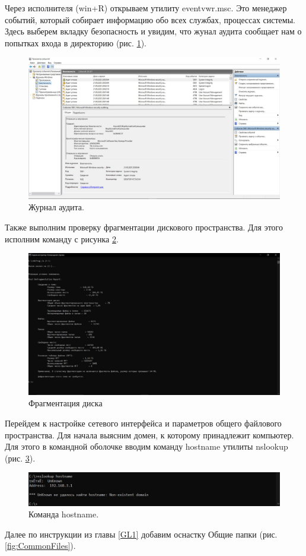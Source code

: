 Через исполнителя (win+R) открываем утилиту eventvwr.msc. Это менеджер событий, который собирает информацию обо всех службах, процессах системы. Здесь выберем вкладку безопасность и увидим, что жунал аудита сообщает нам о попытках входа в директорию (рис. \ref{fig:EventManager}).

\begin{figure}[h!]
    \centering
    \includegraphics[width=0.5\linewidth]{Pic/lab2/photo_2025-05-21_21-19-33.jpg}
    \caption{Журнал аудита.}
    \label{fig:EventManager}
\end{figure}

Также выполним проверку фрагментации дискового пространства. Для этого исполним команду с рисунка \ref{fig:discfrag}.

\begin{figure}[h!]
    \centering
    \includegraphics[width=0.9\linewidth]{Pic/lab2/photo_2025-05-21_21-19-34.jpg}
    \caption{Фрагментация диска}
    \label{fig:discfrag}
\end{figure}

Перейдем к настройке сетевого интерфейса и параметров общего файлового пространства. Для начала выясним домен, к которому принадлежит компьютер. Для этого в командной оболочке вводим команду hostname утилиты nslookup (рис. \ref{fig:hostname}).
 
\begin{figure}[h!]
    \centering
    \includegraphics[width=\linewidth]{Pic/lab2/photo_2025-05-21_21-19-36.jpg}
    \caption{Команда hostname.}
    \label{fig:hostname}
\end{figure}
\newpage
Далее по инструкции из главы \ref{GL1} добавим оснастку Общие папки (рис. \ref{fig:CommonFiles}).

